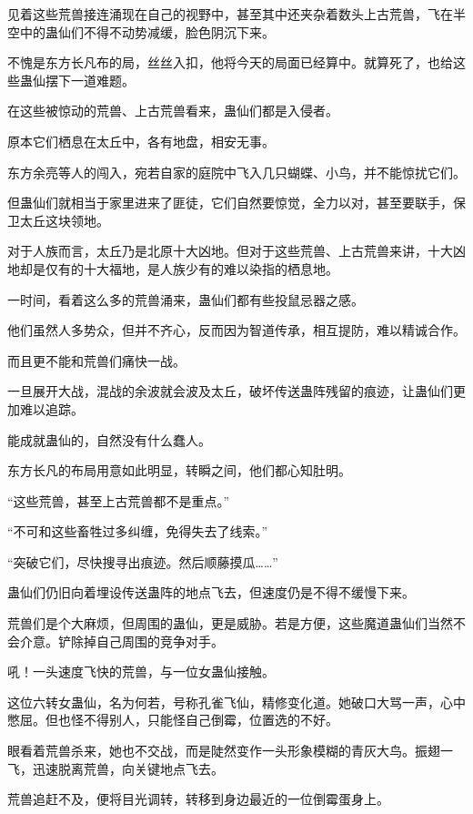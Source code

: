 
\begin{this_body}

见着这些荒兽接连涌现在自己的视野中，甚至其中还夹杂着数头上古荒兽，飞在半空中的蛊仙们不得不动势减缓，脸色阴沉下来。

不愧是东方长凡布的局，丝丝入扣，他将今天的局面已经算中。就算死了，也给这些蛊仙摆下一道难题。

在这些被惊动的荒兽、上古荒兽看来，蛊仙们都是入侵者。

原本它们栖息在太丘中，各有地盘，相安无事。

东方余亮等人的闯入，宛若自家的庭院中飞入几只蝴蝶、小鸟，并不能惊扰它们。

但蛊仙们就相当于家里进来了匪徒，它们自然要惊觉，全力以对，甚至要联手，保卫太丘这块领地。

对于人族而言，太丘乃是北原十大凶地。但对于这些荒兽、上古荒兽来讲，十大凶地却是仅有的十大福地，是人族少有的难以染指的栖息地。

一时间，看着这么多的荒兽涌来，蛊仙们都有些投鼠忌器之感。

他们虽然人多势众，但并不齐心，反而因为智道传承，相互提防，难以精诚合作。

而且更不能和荒兽们痛快一战。

一旦展开大战，混战的余波就会波及太丘，破坏传送蛊阵残留的痕迹，让蛊仙们更加难以追踪。

能成就蛊仙的，自然没有什么蠢人。

东方长凡的布局用意如此明显，转瞬之间，他们都心知肚明。

“这些荒兽，甚至上古荒兽都不是重点。”

“不可和这些畜牲过多纠缠，免得失去了线索。”

“突破它们，尽快搜寻出痕迹。然后顺藤摸瓜……”

蛊仙们仍旧向着埋设传送蛊阵的地点飞去，但速度仍是不得不缓慢下来。

荒兽们是个大麻烦，但周围的蛊仙，更是威胁。若是方便，这些魔道蛊仙们当然不会介意。铲除掉自己周围的竞争对手。

吼！一头速度飞快的荒兽，与一位女蛊仙接触。

这位六转女蛊仙，名为何若，号称孔雀飞仙，精修变化道。她破口大骂一声，心中憋屈。但也怪不得别人，只能怪自己倒霉，位置选的不好。

眼看着荒兽杀来，她也不交战，而是陡然变作一头形象模糊的青灰大鸟。振翅一飞，迅速脱离荒兽，向关键地点飞去。

荒兽追赶不及，便将目光调转，转移到身边最近的一位倒霉蛋身上。


\end{this_body}
